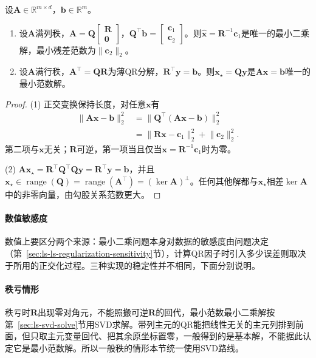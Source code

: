 \begin{theorem}[QR给出最小二乘解与最小范数解]
\label{thm:ls-qr-least-squares}
设$\bm A\in\mathbb R^{m\times d}$，$\bm b\in\mathbb R^m$。
\begin{enumerate}
 \item 设$\bm A$满列秩，$\bm A=\bm Q\left[\begin{smallmatrix}\bm R\\\bm0\end{smallmatrix}\right]$，$\bm Q^\top\bm b=\left[\begin{smallmatrix}\bm c_1\\\bm c_2\end{smallmatrix}\right]$。则$\hat{\bm x}=\bm R^{-1}\bm c_1$是唯一的最小二乘解，最小残差范数为$\lVert\bm c_2\rVert_2$。
 \item 设$\bm A$满行秩，$\bm A^\top=\bm Q\bm R$为薄QR分解，$\bm R^\top\bm y=\bm b$。则$\bm x_\star=\bm Q\bm y$是$\bm A\bm x=\bm b$唯一的最小范数解。
\end{enumerate}
\end{theorem}
\begin{proof}
(1) 正交变换保持长度，对任意$\bm x$有
\begin{equation}
 \begin{aligned}
 \lVert\bm A\bm x-\bm b\rVert_2^2
 &=\lVert\bm Q^\top(\bm A\bm x-\bm b)\rVert_2^2\\
 &=\lVert\bm R\bm x-\bm c_1\rVert_2^2+\lVert\bm c_2\rVert_2^2 .
 \end{aligned}
 \label{eq:ls-qr-residual-split}
\end{equation}
第二项与$\bm x$无关；$\bm R$可逆，第一项当且仅当$\bm x=\bm R^{-1}\bm c_1$时为零。

(2) $\bm A\bm x_\star=\bm R^\top\bm Q^\top\bm Q\bm y=\bm R^\top\bm y=\bm b$，并且$\bm x_\star\in\operatorname{range}(\bm Q)=\operatorname{range}(\bm A^\top)=(\ker\bm A)^\perp$。任何其他解都与$\bm x_\star$相差$\ker\bm A$中的非零向量，由勾股关系范数更大。
\end{proof}

\paragraph{数值敏感度}
数值上要区分两个来源：最小二乘问题本身对数据的敏感度由问题决定（第~\ref{sec:ls-ls-regularization-sensitivity}节），计算QR因子时引入多少误差则取决于所用的正交化过程。三种实现的稳定性并不相同，下面分别说明。

\paragraph{秩亏情形}
秩亏时$\bm R$出现零对角元，不能照搬可逆$\bm R$的回代，最小范数最小二乘解按第~\ref{sec:ls-svd-solve}节用SVD求解。带列主元的QR能把线性无关的主元列排到前面，但只取主元变量回代、把其余原坐标置零，一般得到的是基本解，不能据此认定它是最小范数解。所以一般秩的情形本节统一使用SVD路线。

